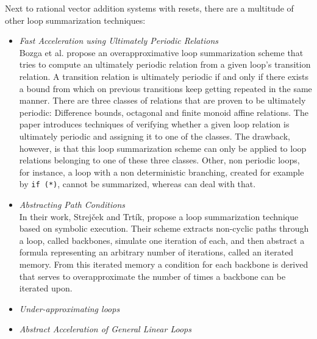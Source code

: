 
Next to rational vector addition systems with resets, there are a multitude of other loop summarization techniques:

\begin{itemize}
	\item \textsl{Fast Acceleration using Ultimately Periodic Relations}\cite{10.1007/978-3-642-14295-6_23}\\ Bozga et al. propose an overapproximative loop summarization scheme that tries to compute an ultimately periodic relation from a given loop's transition relation. A transition relation is ultimately periodic if and only if there exists a bound from which on previous transitions keep getting repeated in the same manner. There are three classes of relations that are proven to be ultimately periodic: Difference bounds, octagonal and finite monoid affine relations. The paper introduces techniques of verifying whether a given loop relation is ultimately periodic and assigning it to one of the classes. The drawback, however, is that this loop summarization scheme can only be applied to loop relations belonging to one of these three classes. Other, non periodic loops, for instance, a loop with a non deterministic branching, created for example by \texttt{if (*)}, cannot be summarized, whereas \qvasr can deal with that.
	
	\item \textsl{Abstracting Path Conditions}\cite{DBLP:conf/issta/StrejcekT12} \\
	In their work, Strejček and Trtík, propose a loop summarization technique based on symbolic execution. Their scheme extracts non-cyclic paths through a loop, called backbones, simulate one iteration of each, and then abstract a formula representing an arbitrary number of iterations, called an iterated memory. From this iterated memory a condition for each backbone is derived that serves to overapproximate the number of times a backbone can be iterated upon.  
	
	\item \textsl{Under-approximating loops}\cite{DBLP:conf/cav/KroeningLW13}
	
	\item \textsl{Abstract Acceleration of General Linear Loops}\cite{DBLP:conf/popl/JeannetSS14}
\end{itemize}